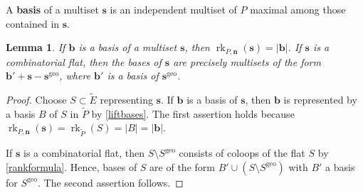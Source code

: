 \documentclass[11pt]{article}
\newtheorem{lemm}[theo]{Lemma}
\theoremstyle{definition}
\numberwithin{equation}{section}
\newcommand{\geo}{\mathrm{geo}}
\DeclareMathOperator{\rk}{rk}
\newcommand{\word}[1]{\textbf{#1}}
\begin{document}
A \word{basis} of a multiset $\mathbf s$ is an independent multiset of $P$ maximal among those contained in $\mathbf s$.
\begin{lemm}\label{indeprank}
  If $\mathbf b$ is a basis of a multiset $\mathbf s$, then $\rk_{P, \mathbf n}(\mathbf s) = |\mathbf b|$.
  If $\mathbf s$ is a combinatorial flat, then the bases of $\mathbf s$ are precisely multisets of the form $\mathbf b' + \mathbf s - \mathbf s^\geo$, where $\mathbf b'$ is a basis of $\mathbf s^\geo$.
\end{lemm}
\begin{proof}
  Choose $S \subset \widetilde E$ representing $\mathbf s$.
  If $\mathbf b$ is a basis of $\mathbf s$,
  then $\mathbf b$ is represented by a basis $B$ of $S$ in $\widetilde P$ by \cref{liftbases}.
  The first assertion holds because $\rk_{P, \mathbf n}(\mathbf s) = \rk_{\widetilde P}(S) = |B| = |\mathbf b|$.

  If $\mathbf s$ is a combinatorial flat, then $S \setminus S^\geo$ consists of coloops of the flat $S$ by \cref{rankformula}.
  Hence, bases of $S$ are of the form $B' \cup (S \setminus S^\geo)$ with $B'$ a basis for $S^\geo$.
  The second assertion follows.
\end{proof}
\end{document}
